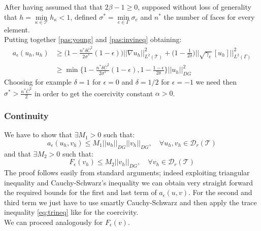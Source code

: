 \documentclass[12pt, a4paper]{article}
\theoremstyle{definition}
\theoremstyle{plain}
\theoremstyle{plain}
\begin{document}
After having assumed that that $2\beta - 1 \geq 0$, supposed without loss of generality that $h = \min\limits_{\kappa \in \mathcal{T}} h_\kappa < 1$, defined $\sigma^* = \min\limits_{e \in \Gamma} \sigma_e$ and $n^*$ the number of faces for every element.\\
Putting together \eqref{pas:young} and \eqref{pas:invineq} obtaining:
\begin{equation*}
\begin{split}
a_\epsilon(u_h, u_h) &\geq \big(1 - \frac{n^*\delta\bar{C}^2}{2\sigma^*} (1-\epsilon)\big) \big|\!\big| \nabla u_h \big|\!\big|^2_{L^2(\mathcal{T})}
+ \big(1 - \frac{1}{2\delta} \big) \bigg|\!\bigg| \sqrt{\gamma_e} [u_h] \bigg|\!\bigg|^2_{L^2(\Gamma)}\\
&\geq \min\bigg\{1 - \frac{n^*\delta\bar{C}^2}{2\sigma^*} (1-\epsilon) , 1 - \frac{1-\epsilon}{2\delta}\bigg\} |\!|u_h|\!|^2_{DG}
\end{split}
\end{equation*}
Choosing for example $\delta = 1$ for $\epsilon = 0$ and  $\delta = 1/2$ for $\epsilon = -1 $ we need then $\sigma^* > \frac{n^*\bar{C}^2}{2}$ in order to get the coercivity constant $\alpha > 0$.
\subsubsection{Continuity}
We have to show that $\exists M_1 > 0$ such that:
\begin{equation*}
	a_\epsilon(u_h, v_h) \leq M_1 |\!|u_h|\!|_{DG} |\!|v_h|\!|_{DG}, \quad \forall u_h, v_h \in \mathcal{D}_r(\mathcal{T})
\end{equation*}
and that $\exists M_2 > 0$ such that:
\begin{equation*}
	F_\epsilon(v_h) \leq M_2 |\!|v_h|\!|_{DG}, \quad \forall v_h \in \mathcal{D}_r(\mathcal{T})
\end{equation*}
The proof follows easily from standard arguments; indeed exploiting triangular inequality and Cauchy-Schwarz's inequality we can obtain very straight forward the required bounds for the first and last term of $a_\epsilon(u, v)$. For the second and third term we just have to use smartly Cauchy-Schwarz and then apply the trace inequality \eqref{eq:trineq} like for the coercivity.\\
We can proceed analogously for $F_\epsilon(v)$.
\end{document}
